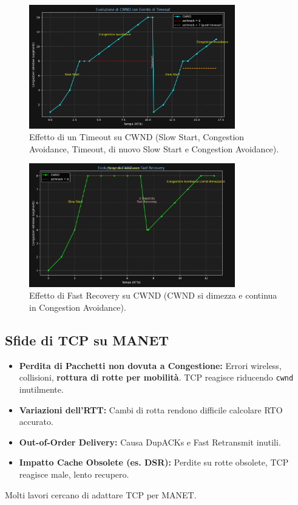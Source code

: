 \begin{figure}[H]
    \centering
    \includegraphics[width=0.8\textwidth]{images/cwnd_timeout.png}
    \caption{Effetto di un Timeout su CWND (Slow Start, Congestion Avoidance, Timeout, di nuovo Slow Start e Congestion Avoidance).}
    \label{fig:cwnd_timeout}
\end{figure}

\begin{figure}[H]
    \centering
    \includegraphics[width=0.8\textwidth]{images/cwnd_fastrecovery.png}
    \caption{Effetto di Fast Recovery su CWND (CWND si dimezza e continua in Congestion Avoidance).}
    \label{fig:cwnd_fastrecovery}
\end{figure}


\subsection{Sfide di TCP su MANET}
\begin{itemize}
    \item \textbf{Perdita di Pacchetti non dovuta a Congestione:} Errori wireless, collisioni, \textbf{rottura di rotte per mobilità}. TCP reagisce riducendo \texttt{cwnd} inutilmente.
    \item \textbf{Variazioni dell'RTT:} Cambi di rotta rendono difficile calcolare RTO accurato.
    \item \textbf{Out-of-Order Delivery:} Causa DupACKs e Fast Retransmit inutili.
    \item \textbf{Impatto Cache Obsolete (es. DSR):} Perdite su rotte obsolete, TCP reagisce male, lento recupero.
\end{itemize}
Molti lavori cercano di adattare TCP per MANET.

